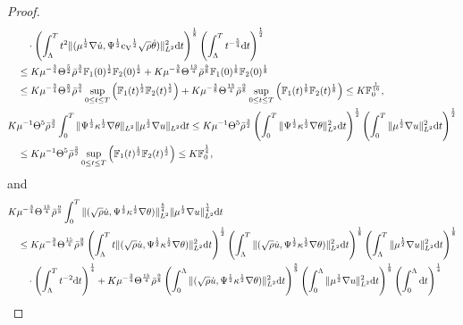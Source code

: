 \documentclass[11pt]{article}
\newcommand{\na}{\nabla}
\begin{document}
\begin{proof}
\begin{align*}
& \qquad \cdot \left( \int_{\Lambda}^T t^2 \|(\mu^{\frac{1}{2}}\na \dot{u}, \Psi^{\frac{1}{2}} {\rm c_V}^{\frac{1}{2}} \sqrt{\rho} \dot{\theta})\|_{L^2}^2 {\rm d} t\right)^{\frac{1}{8}} \left(\int_{\Lambda}^T t^{- \frac{5}{4}} {\rm d} t \right)^{\frac{1}{2}}\\
& \quad \leq K \mu^{-\frac{3}{4}} \Theta^{\frac{5}{2}} \bar{\rho}^{\frac{3}{4}} \mathbb{F}_1 (0)^{\frac{1}{2}} \mathbb{F}_2 (0)^{\frac{1}{2}} + K \mu^{-\frac{3}{8}} \Theta^{\frac{13}{4}} \bar{\rho}^{\frac{9}{8}} \mathbb{F}_1 (0)^{\frac{1}{8}} \mathbb{F}_2 (0)^{\frac{1}{8}}\\
& \quad \leq K \mu^{-\frac{3}{4}} \Theta^{\frac{5}{2}} \bar{\rho}^{\frac{3}{4}} \sup_{0 \leq t \leq T}\Big(\mathbb{F}_1 (t)^{\frac{1}{2}} \mathbb{F}_2 (t)^{\frac{1}{2}}\Big)+ K \mu^{-\frac{3}{8}} \Theta^{\frac{13}{4}} \bar{\rho}^{\frac{9}{8}} \sup_{0 \leq t \leq T}\Big(\mathbb{F}_1 (t)^{\frac{1}{8}} \mathbb{F}_2 (t)^{\frac{1}{8}}\Big)\leq K \mathbb{F}_0^{\frac{1}{16}},\\
& K \mu^{-1} \Theta^5 \bar{\rho}^{\frac{3}{2}} \int^T_0 \|\Psi^{\frac{1}{2}} \kappa^{\frac{1}{2}} \na \theta\|_{L^2} \|\mu^{\frac{1}{2}}\na u\|_{L^2} {\rm d} t \leq K \mu^{-1} \Theta^5 \bar{\rho}^{\frac{3}{2}} \left(\int^T_0 \|\Psi^{\frac{1}{2}} \kappa^{\frac{1}{2}} \na \theta\|_{L^2}^2 {\rm d} t \right)^{\frac{1}{2}} \left(\int^T_0 \|\mu^{\frac{1}{2}}\na u\|_{L^2}^2 {\rm d} t \right)^{\frac{1}{2}}\\
&\quad \leq K \mu^{-1} \Theta^5 \bar{\rho}^{\frac{3}{2}} \sup_{0 \leq t \leq T} \Big(\mathbb{F}_1 (t)^{\frac{1}{2}} \mathbb{F}_2 (t)^{\frac{1}{2}}\Big)\leq K \mathbb{F}_0^{\frac{1}{4}},
\end{align*}
and
\begin{align*}
& K \mu^{-\frac{3}{4}} \Theta^{\frac{15}{4}} \bar{\rho}^{\frac{9}{8}} \int^T_0 \|(\sqrt{\rho} \dot{u}, \Psi^{\frac{1}{2}} \kappa^{\frac{1}{2}} \na \theta)\|_{L^2}^{\frac{5}{4}} \|\mu^{\frac{1}{2}}\na u\|_{L^2}^{\frac{1}{4}} {\rm d} t\\
& \quad \leq K \mu^{-\frac{3}{4}} \Theta^{\frac{15}{4}} \bar{\rho}^{\frac{9}{8}} \left(\int_{\Lambda}^T t \|(\sqrt{\rho} \dot{u}, \Psi^{\frac{1}{2}} \kappa^{\frac{1}{2}} \na \theta)\|_{L^2}^2 {\rm d} t \right)^{\frac{1}{2}}  \left(\int_{\Lambda}^T \|(\sqrt{\rho} \dot{u}, \Psi^{\frac{1}{2}} \kappa^{\frac{1}{2}} \na \theta)\|_{L^2}^2 {\rm d} t \right)^{\frac{1}{8}} \left(\int_{\Lambda}^T \|\mu^{\frac{1}{2}}\na u\|_{L^2}^2 {\rm d} t \right)^{\frac{1}{8}} \\
& \qquad \cdot \left(\int_{\Lambda}^T t^{-2} {\rm d} t \right)^{\frac{1}{4}} + K \mu^{-\frac{3}{4}} \Theta^{\frac{15}{4}} \bar{\rho}^{\frac{9}{8}} \left(\int^{\Lambda}_0 \|(\sqrt{\rho} \dot{u}, \Psi^{\frac{1}{2}} \kappa^{\frac{1}{2}} \na \theta)\|_{L^2}^2 {\rm d} t \right)^{\frac{5}{8}} \left(\int^{\Lambda}_0 \|\mu^{\frac{1}{2}}\na u\|_{L^2}^2 {\rm d} t \right)^{\frac{1}{8}} \left(\int^{\Lambda}_0 {\rm d} t \right)^{\frac{1}{4}}\\

\end{align*}
\end{proof}
\end{document}

